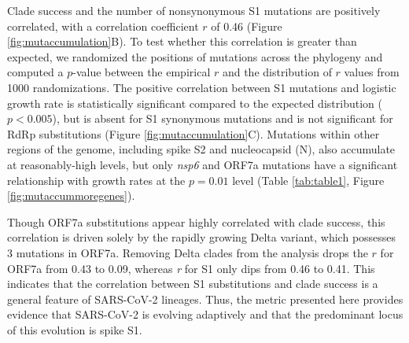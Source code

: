 \documentclass[11pt,oneside,letterpaper]{article}
\begin{document}
Clade success and the number of nonsynonymous S1 mutations are positively correlated, with a correlation coefficient $r$ of 0.46 (Figure \ref{fig:mutaccumulation}B). 
To test whether this correlation is greater than expected, we randomized the positions of mutations across the phylogeny and computed a $p$-value between the empirical $r$ and the distribution of $r$ values from 1000 randomizations. 
The positive correlation between S1 mutations and logistic growth rate is statistically significant compared to the expected distribution ($p<0.005$), but is absent for S1 synonymous mutations and is not significant for RdRp substitutions (Figure \ref{fig:mutaccumulation}C). 
Mutations within other regions of the genome, including spike S2 and nucleocapsid (N), also accumulate at reasonably-high levels, but only \emph{nsp6} and ORF7a mutations have a significant relationship with growth rates at the $p=0.01$ level (Table \ref{tab:table1}, Figure \ref{fig:mutaccummoregenes}).

Though ORF7a substitutions appear highly correlated with clade success, this correlation is driven solely by the rapidly growing Delta variant, which possesses 3 mutations in ORF7a. 
Removing Delta clades from the analysis drops the $r$ for ORF7a from 0.43 to 0.09, whereas \emph{r} for S1 only dips from 0.46 to 0.41. 
This indicates that the correlation between S1 substitutions and clade success is a general feature of SARS-CoV-2 lineages. 
Thus, the metric presented here provides evidence that SARS-CoV-2 is evolving adaptively and that the predominant locus of this evolution is spike S1.
\end{document}
